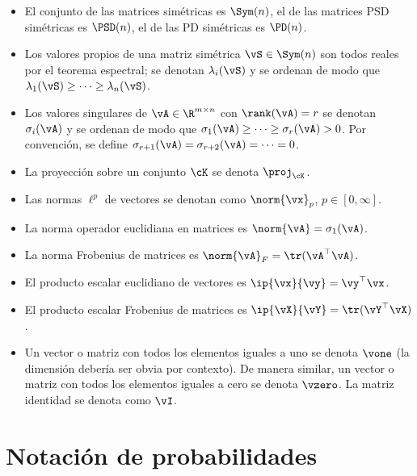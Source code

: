 \documentclass[../book-main_es.tex]{subfiles}
\begin{document}
\begin{itemize}
        \R^{m \times n}\) o \(\O(n) = \O(n, n)\).
    \item El conjunto de las matrices simétricas es \(\Sym(n)\), el de las matrices PSD simétricas
        es \(\PSD(n)\), el de las PD simétricas es \(\PD(n)\).
    \item Los valores propios de una matriz simétrica \(\vS \in \Sym(n)\) son
        todos reales por el teorema espectral; se denotan
        \(\lambda_{i}(\vS)\) y se ordenan de modo que \(\lambda_{1}(\vS)
        \geq \cdots \geq \lambda_{n}(\vS)\).
    \item Los valores singulares de \(\vA \in \R^{m \times n}\) con
        \(\rank(\vA) = r\) se denotan  \(\sigma_{i}(\vA)\) y se
        ordenan de modo que \(\sigma_{1}(\vA) \geq \cdots \geq
        \sigma_{r}(\vA) > 0\). Por convención, se define \(\sigma_{r +
        1}(\vA) = \sigma_{r + 2}(\vA) = \cdots = 0\).
    \item La proyección sobre un conjunto \(\cK\) se denota \(\proj_{\cK}\).
    \item Las normas \(\ell^{p}\) de vectores se denotan como
        \(\norm{\vx}_{p}\), \(p \in [0, \infty]\).
    \item La norma operador euclidiana en matrices es \(\norm{\vA} =
        \sigma_{1}(\vA)\).
    \item La norma Frobenius de matrices es \(\norm{\vA}_{F} =
        \tr(\vA^{\top}\vA)\).
    \item El producto escalar euclidiano de vectores es \(\ip{\vx}{\vy} =
        \vy^{\top} \vx\).
    \item El producto escalar Frobenius de matrices es \(\ip{\vX}{\vY}
        = \tr(\vY^{\top}\vX)\).
    \item Un vector o matriz con todos los elementos iguales a uno se denota \(\vone\) 
        (la dimensión debería ser obvia por contexto). De manera similar, 
        un vector o matriz con todos los elementos iguales a cero se denota \(\vzero\). La matriz 
        identidad se denota como \(\vI\).
\end{itemize}

\section*{Notación de probabilidades}
\end{document}
